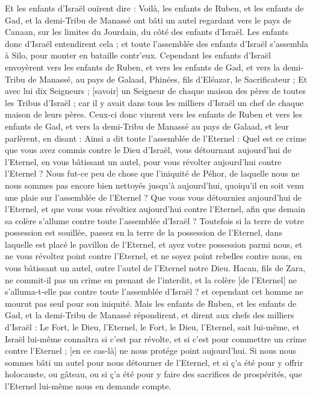 \begin{multicols}{2}
Et les enfants d'Israël ouïrent dire : Voilà, les enfants de Ruben, et les enfants de Gad, et la demi-Tribu de Manassé ont bâti un autel regardant vers le pays de Canaan, sur les limites du Jourdain, du côté des enfants d'Israël.
Les enfants donc d'Israël entendirent cela ; et toute l'assemblée des enfants d'Israël s'assembla à Silo, pour monter en bataille contr'eux.
Cependant les enfants d'Israël envoyèrent vers les enfants de Ruben, et vers les enfants de Gad, et vers la demi-Tribu de Manassé, au pays de Galaad, Phinées, fils d'Eléazar, le Sacrificateur ;
Et avec lui dix Seigneurs ; [savoir] un Seigneur de chaque maison des pères de toutes les Tribus d'Israël ; car il y avait dans tous les milliers d'Israël un chef de chaque maison de leurs pères.
Ceux-ci donc vinrent vers les enfants de Ruben et vers les enfants de Gad, et vers la demi-Tribu de Manassé au pays de Galaad, et leur parlèrent, en disant :
Ainsi a dit toute l'assemblée de l'Eternel : Quel est ce crime que vous avez commis contre le Dieu d'Israël, vous détournant aujourd'hui de l'Eternel, en vous bâtissant un autel, pour vous révolter aujourd'hui contre l'Eternel ?
Nous fut-ce peu de chose que l'iniquité de Péhor, de laquelle nous ne nous sommes pas encore bien nettoyés jusqu'à aujourd'hui, quoiqu'il en soit venu une plaie sur l'assemblée de l'Eternel ?
Que vous vous détourniez aujourd'hui de l'Eternel, et que vous vous révoltiez aujourd'hui contre l'Eternel, afin que demain sa colère s'allume contre toute l'assemblée d'Israël ?
Toutefois si la terre de votre possession est souillée, passez en la terre de la possession de l'Eternel, dans laquelle est placé le pavillon de l'Eternel, et ayez votre possession parmi nous, et ne vous révoltez point contre l'Eternel, et ne soyez point rebelles contre nous, en vous bâtissant un autel, outre l'autel de l'Eternel notre Dieu.
Hacan, fils de Zara, ne commit-il pas un crime en prenant de l'interdit, et la colère [de l'Eternel] ne s'alluma-t-elle pas contre toute l'assemblée d'Israël ? et cependant cet homme ne mourut pas seul pour son iniquité.
Mais les enfants de Ruben, et les enfants de Gad, et la demi-Tribu de Manassé répondirent, et dirent aux chefs des milliers d'Israël :
Le Fort, le Dieu, l'Eternel, le Fort, le Dieu, l'Eternel, sait lui-même, et Israël lui-même connaîtra si c'est par révolte, et si c'est pour commettre un crime contre l'Eternel ; [en ce cas-là] ne nous protége point aujourd'hui.
Si nous nous sommes bâti un autel pour nous détourner de l'Eternel, et si ç'a été pour y offrir holocauste, ou gâteau, ou si ç'a été pour y faire des sacrifices de prospérités, que l'Eternel lui-même nous en demande compte.

\end{multicols}
